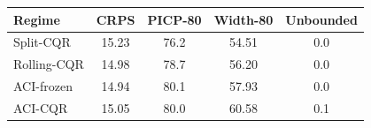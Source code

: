 \begin{tabular}{|l|c|c|c|c|}
\hline
Regime & CRPS & PICP-80 & Width-80 & Unbounded \\
\hline
Split-CQR & 15.23 & 76.2 & 54.51 & 0.0 \\
Rolling-CQR & 14.98 & 78.7 & 56.20 & 0.0 \\
ACI-frozen & 14.94 & 80.1 & 57.93 & 0.0 \\
ACI-CQR & 15.05 & 80.0 & 60.58 & 0.1 \\
\hline
\end{tabular}
